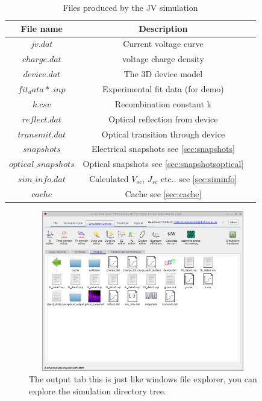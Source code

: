 \begin{table}[H]
\begin{center}
\begin{tabular}{ |c|c|c| } 
 \hline
	File name 			& 	Description  \\ 
 \hline
	$jv.dat$ 			&	Current voltage curve \\ 
	$charge.dat$ 		&	voltage charge density\\ 
	$device.dat$ 		&	The 3D device model\\ 
	$fit_data*.inp$ 	&	Experimental fit data (for demo)\\
	$k.csv$ 			&	Recombination constant k\\ 
	$reflect.dat$ 		&	Optical reflection from device\\ 
	$transmit.dat$ 		&	Optical transition through device\\ 
	$snapshots$ 		&	Electrical snapshots see \ref{sec:snapshots}\\
	$optical\_snapshots$&	Optical snapshots see \ref{sec:snapshotsoptical} \\
	$sim\_info.dat$ 	&	Calculated $V_{oc}$, $J_{sc}$ etc.. see \ref{sec:siminfo}   \\
	$cache$ 			&	Cache see \ref{sec:cache}  \\
 \hline
\end{tabular}
\caption{Files produced by the JV simulation}
\label{fig:output}
\end{center}
\end{table}

\begin{figure}[H]
\centering
\includegraphics[width=100mm,height=70mm]{./images/output.png}
\caption{The output tab this is just like windows file explorer, you can explore the simulation directory tree.}
\label{fig:output}
\end{figure}


